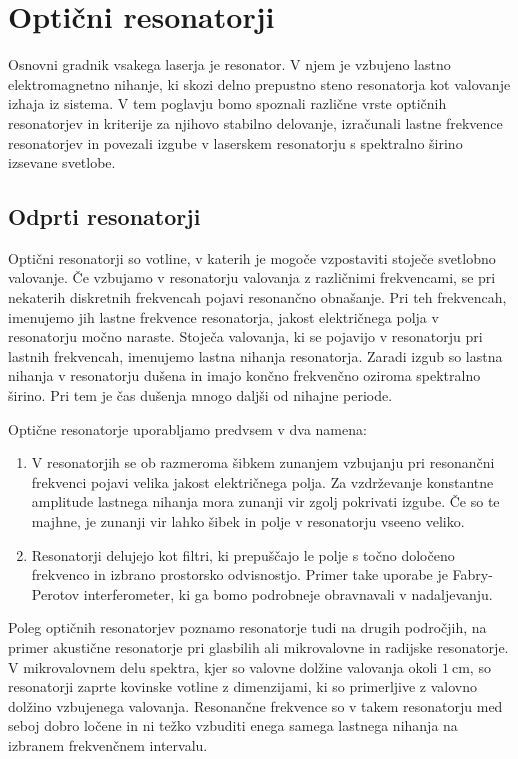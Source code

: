 
\chapter{Optični resonatorji}
Osnovni gradnik vsakega laserja je resonator. V njem je vzbujeno lastno elektromagnetno
nihanje, ki skozi delno prepustno steno resonatorja kot valovanje
izhaja iz sistema. V tem poglavju bomo 
spoznali različne vrste optičnih resonatorjev in kriterije za njihovo stabilno delovanje,
izračunali lastne frekvence resonatorjev in povezali izgube v laserskem resonatorju s
spektralno širino izsevane svetlobe.

\section{Odprti resonatorji}
Optični resonatorji so votline, v katerih je mogoče 
vzpostaviti stoječe svetlobno valovanje. Če vzbujamo v resonatorju valovanja z 
različnimi frekvencami, se pri nekaterih diskretnih frekvencah pojavi resonančno
obnašanje. Pri teh frekvencah, imenujemo jih lastne frekvence
resonatorja, jakost električnega polja v resonatorju močno naraste. Stoječa valovanja, ki
se pojavijo v resonatorju pri lastnih frekvencah, imenujemo lastna nihanja resonatorja.
Zaradi izgub so lastna nihanja v resonatorju dušena in imajo končno frekvenčno oziroma spektralno 
širino. Pri tem je čas dušenja mnogo daljši od nihajne periode. 

Optične resonatorje uporabljamo predvsem v dva namena:
\begin{enumerate}
\item V resonatorjih se ob razmeroma šibkem zunanjem vzbujanju 
pri resonančni frekvenci pojavi velika jakost
električnega polja. Za vzdrževanje
konstantne amplitude lastnega nihanja mora zunanji vir zgolj pokrivati izgube. 
Če so te majhne, je zunanji vir lahko šibek in polje
v resonatorju vseeno veliko.
\item Resonatorji delujejo kot filtri, ki prepuščajo le polje s točno  
določeno frekvenco in izbrano prostorsko odvisnostjo. Primer take uporabe je 
Fabry-Perotov interferometer, ki ga bomo podrobneje
obravnavali v nadaljevanju.
\end{enumerate}

\begin{remark}
Poleg optičnih resonatorjev poznamo resonatorje tudi na drugih področjih, 
na primer akustične resonatorje pri glasbilih ali mikrovalovne in radijske resonatorje. 
V mikrovalovnem delu spektra, kjer so valovne dolžine valovanja
okoli $1~\si{\centi\metre}$, 
so resonatorji zaprte kovinske votline z dimenzijami, ki so primerljive z 
valovno dolžino vzbujenega valovanja. Resonančne frekvence so v takem resonatorju 
med seboj dobro ločene in ni težko vzbuditi enega samega lastnega nihanja na izbranem 
frekvenčnem intervalu.
\end{remark}

